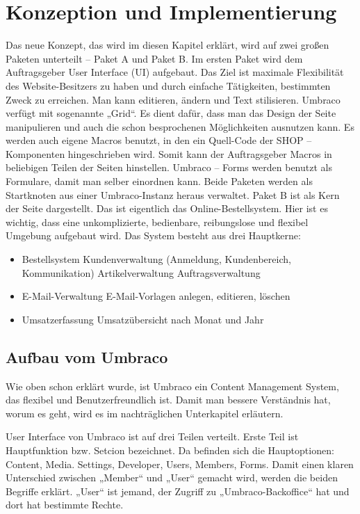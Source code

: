 \chapter{Konzeption und Implementierung}

Das neue Konzept, das wird im diesen Kapitel erklärt, wird auf zwei großen Paketen unterteilt – Paket A und Paket B. 
Im ersten Paket wird dem Auftragsgeber User Interface (UI) aufgebaut. Das Ziel ist maximale Flexibilität des Website-Besitzers zu haben und durch einfache Tätigkeiten, bestimmten Zweck zu erreichen. Man kann editieren, ändern und Text stilisieren. Umbraco verfügt mit sogenannte „Grid“. Es dient dafür, dass man das Design der Seite manipulieren und auch die schon besprochenen Möglichkeiten ausnutzen kann. 
Es werden auch eigene Macros benutzt, in den ein Quell-Code der SHOP – Komponenten hingeschrieben wird. Somit kann der Auftragsgeber Macros in beliebigen Teilen der Seiten hinstellen. Umbraco – Forms werden benutzt als Formulare, damit man selber einordnen kann.
Beide Paketen werden als Startknoten aus einer Umbraco-Instanz heraus verwaltet. 
Paket B ist als Kern der Seite dargestellt. Das ist eigentlich das Online-Bestellsystem. Hier ist es wichtig, dass eine unkomplizierte, bedienbare, reibungslose und flexibel Umgebung aufgebaut wird. Das System besteht aus drei Hauptkerne: 
\begin{itemize}	
	\item Bestellsystem
	\subitem Kundenverwaltung (Anmeldung, Kundenbereich, Kommunikation)
	\subitem Artikelverwaltung
	\subitem Auftragsverwaltung
	\item E-Mail-Verwaltung
	\subitem E-Mail-Vorlagen anlegen, editieren, löschen
	\item Umsatzerfassung
	\subitem Umsatzübersicht nach Monat und Jahr
\end{itemize}

\section{Aufbau vom Umbraco}
Wie oben schon erklärt wurde, ist Umbraco ein Content Management System, das flexibel und Benutzerfreundlich ist. Damit man bessere Verständnis hat, worum es geht, wird es im nachträglichen Unterkapitel erläutern. 

User Interface von Umbraco ist auf drei Teilen verteilt. Erste Teil ist Hauptfunktion bzw. Setcion bezeichnet. Da befinden sich die Hauptoptionen: Content, Media. Settings, Developer, Users, Members, Forms.
Damit einen klaren Unterschied zwischen „Member“ und „User“ gemacht wird, werden die beiden Begriffe erklärt. „User“ ist jemand, der Zugriff zu „Umbraco-Backoffice“ hat und dort hat bestimmte Rechte. 

